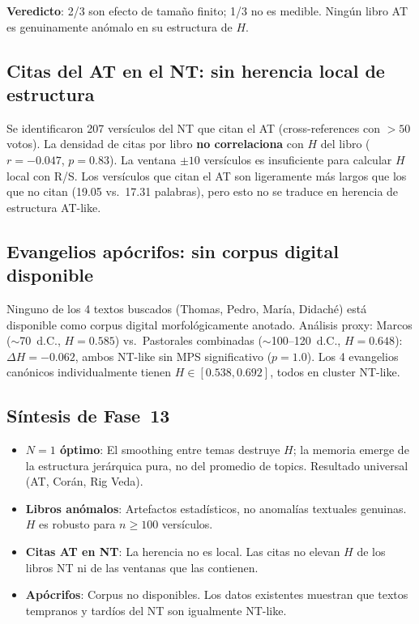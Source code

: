 \documentclass[12pt,a4paper]{article}
\begin{document}
\textbf{Veredicto}: 2/3 son efecto de tama\~no finito; 1/3 no es medible.
Ning\'un libro AT es genuinamente an\'omalo en su estructura de $H$.

\subsection{Citas del AT en el NT: sin herencia local de estructura}

Se identificaron 207 vers\'iculos del NT que citan el AT
(cross-references con $> 50$ votos). La densidad de citas por libro
\textbf{no correlaciona} con $H$ del libro ($r = -0.047$, $p = 0.83$).
La ventana $\pm 10$ vers\'iculos es insuficiente para calcular $H$ local
con R/S. Los vers\'iculos que citan el AT son ligeramente m\'as largos que
los que no citan (19.05 vs.\ 17.31 palabras), pero esto no se traduce
en herencia de estructura AT-like.

\subsection{Evangelios ap\'ocrifos: sin corpus digital disponible}

Ninguno de los 4 textos buscados (Thomas, Pedro, Mar\'ia, Didach\'e) est\'a
disponible como corpus digital morfol\'ogicamente anotado. An\'alisis proxy:
Marcos ($\sim$70~d.C., $H = 0.585$) vs.\ Pastorales combinadas
($\sim$100--120~d.C., $H = 0.648$): $\Delta H = -0.062$, ambos NT-like
sin MPS significativo ($p = 1.0$). Los 4 evangelios can\'onicos individualmente
tienen $H \in [0.538, 0.692]$, todos en cluster NT-like.

\subsection{S\'intesis de Fase~13}

\begin{itemize}[leftmargin=2em]
\item \textbf{$N = 1$ \'optimo}: El smoothing entre temas destruye $H$;
      la memoria emerge de la estructura jer\'arquica pura, no del promedio
      de topics. Resultado universal (AT, Cor\'an, Rig Veda).
\item \textbf{Libros an\'omalos}: Artefactos estad\'isticos, no anomal\'ias
      textuales genuinas. $H$ es robusto para $n \geq 100$ vers\'iculos.
\item \textbf{Citas AT en NT}: La herencia no es local. Las citas no elevan
      $H$ de los libros NT ni de las ventanas que las contienen.
\item \textbf{Ap\'ocrifos}: Corpus no disponibles. Los datos existentes muestran
      que textos tempranos y tard\'ios del NT son igualmente NT-like.
\end{itemize}
\end{document}

